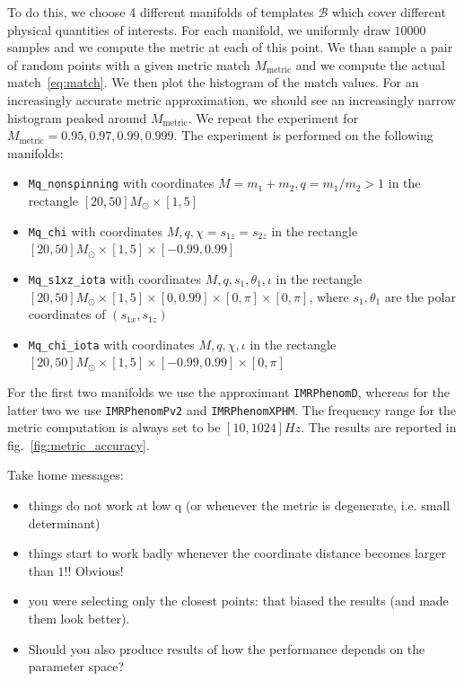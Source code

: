 \documentclass[twocolumn,showpacs,preprintnumbers,nofootinbib,prd,
superscriptaddress,10pt]{revtex4-1}
\begin{document}
To do this, we choose 4 different manifolds of templates $\mathcal{B}$ which cover different physical quantities of interests. For each manifold, we uniformly draw $10000$ samples and we compute the metric at each of this point. We than sample a pair of random points with a given metric match $M_{\text{metric}}$ and we compute the actual match~\eqref{eq:match}.
We then plot the histogram of the match values. For an increasingly accurate metric approximation, we should see an increasingly narrow histogram peaked around $M_{\text{metric}}$.
We repeat the experiment for $M_{\text{metric}} = 0.95, 0.97, 0.99, 0.999$.
The experiment is performed on the following manifolds:
\begin{itemize}
	\item \texttt{Mq\_nonspinning} with coordinates $M = m_1+m_2, q = m_1/m_2>1$ in the rectangle $[20, 50] M_\odot \times [1,5]$
	\item \texttt{Mq\_chi} with coordinates $M, q, \chi = s_{1z} = s_{2z}$ in the rectangle $[20, 50] M_\odot \times [1,5] \times [-0.99, 0.99]$
	\item \texttt{Mq\_s1xz\_iota} with coordinates $M, q, s_{1}, \theta_1, \iota$ in the rectangle $[20, 50] M_\odot \times [1,5] \times [0, 0.99] \times [0,\pi]  \times [0,\pi]$, where $s_1, \theta_1$ are the polar coordinates of $(s_{1x}, s_{1z})$
	\item \texttt{Mq\_chi\_iota} with coordinates $M, q, \chi, \iota$ in the rectangle $[20, 50] M_\odot \times [1,5] \times [-0.99, 0.99] \times [0,\pi]$
\end{itemize}

For the first two manifolds we use the approximant \texttt{IMRPhenomD}, whereas for the latter two we use \texttt{IMRPhenomPv2} and \texttt{IMRPhenomXPHM}. The frequency range for the metric computation is always set to be $[10, 1024]Hz$.
The results are reported in fig.~\ref{fig:metric_accuracy}.

Take home messages:
\begin{itemize}
	\item things do not work at low q (or whenever the metric is degenerate, i.e. small determinant)
	\item things start to work badly whenever the coordinate distance becomes larger than $1$!! Obvious!
	\item you were selecting only the closest points: that biased the results (and made them look better).
	\item Should you also produce results of how the performance depends on the parameter space?
\end{itemize} 
\end{document}
